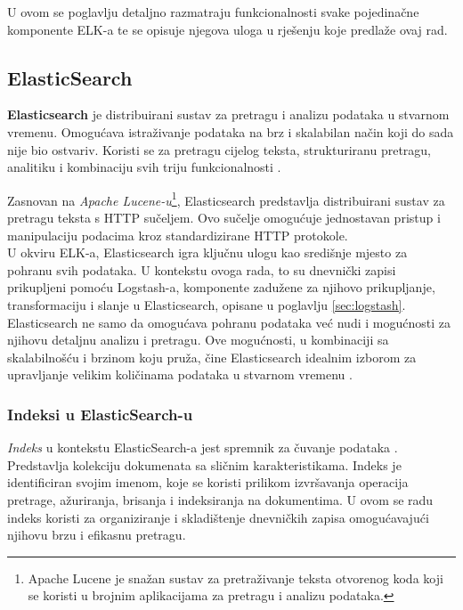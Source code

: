 \documentclass[times, utf8, diplomski]{fer}
\begin{document}
U ovom se poglavlju detaljno razmatraju funkcionalnosti svake pojedinačne komponente ELK-a te se opisuje njegova uloga u rješenju koje predlaže ovaj rad.

\subsection{ElasticSearch}
\label{sec:elastic}

\textbf{Elasticsearch} je distribuirani sustav za pretragu i analizu podataka u stvarnom vremenu. Omogućava istraživanje podataka na brz i skalabilan način koji do sada nije bio ostvariv. Koristi se za pretragu cijelog teksta, strukturiranu pretragu, analitiku i kombinaciju svih triju funkcionalnosti \citep{gormley_elasticsearch_2015}.

Zasnovan na \emph{Apache Lucene-u}\footnote{Apache Lucene je snažan sustav za pretraživanje teksta otvorenog koda koji se koristi u brojnim aplikacijama za pretragu i analizu podataka.}, Elasticsearch predstavlja distribuirani sustav za pretragu teksta s HTTP sučeljem. Ovo sučelje omogućuje jednostavan pristup i manipulaciju podacima kroz standardizirane HTTP protokole. \\

U okviru ELK-a, Elasticsearch igra ključnu ulogu kao središnje mjesto za pohranu svih podataka. U kontekstu ovoga rada, to su dnevnički zapisi prikupljeni pomoću Logstash-a, komponente zadužene za njihovo prikupljanje, transformaciju i slanje u Elasticsearch, opisane u poglavlju \ref{sec:logstash}.\\

Elasticsearch ne samo da omogućava pohranu podataka već nudi i mogućnosti za njihovu detaljnu analizu i pretragu. Ove mogućnosti, u kombinaciji sa skalabilnošću i brzinom koju pruža, čine Elasticsearch idealnim izborom za upravljanje velikim količinama podataka u stvarnom vremenu .

\subsubsection{Indeksi u ElasticSearch-u}

\emph{Indeks}  u kontekstu ElasticSearch-a jest spremnik za čuvanje podataka \citep{konda_elasticsearch_2023}. Predstavlja kolekciju dokumenata sa sličnim karakteristikama. Indeks je identificiran svojim imenom, koje se koristi prilikom izvršavanja operacija pretrage, ažuriranja, brisanja i indeksiranja na dokumentima. U ovom se radu indeks koristi za organiziranje i skladištenje dnevničkih zapisa omogućavajući njihovu brzu i efikasnu pretragu.
\end{document}

